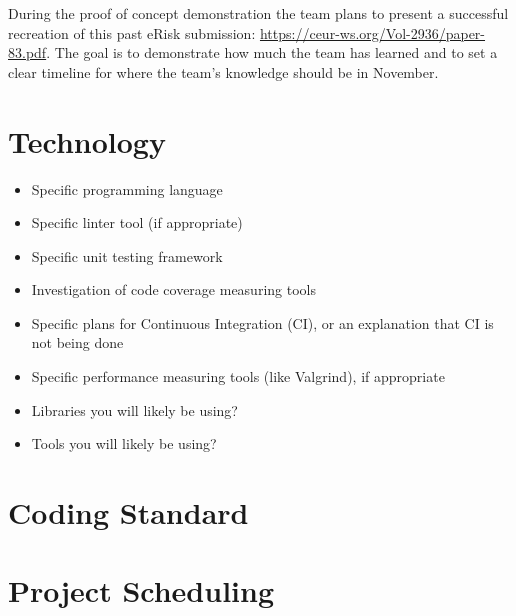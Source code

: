 \documentclass{article}
\begin{document}
During the proof of concept demonstration the team plans to present a successful recreation of this past eRisk submission: \url{https://ceur-ws.org/Vol-2936/paper-83.pdf}. The goal is to demonstrate how much the team has learned and to set a clear timeline for where the team's knowledge should be in November.


\section{Technology}

\begin{itemize}
\item Specific programming language
\item Specific linter tool (if appropriate)
\item Specific unit testing framework
\item Investigation of code coverage measuring tools
\item Specific plans for Continuous Integration (CI), or an explanation that CI
  is not being done
\item Specific performance measuring tools (like Valgrind), if
  appropriate
\item Libraries you will likely be using?
\item Tools you will likely be using?
\end{itemize}

\section{Coding Standard}

\section{Project Scheduling}

\end{document}

